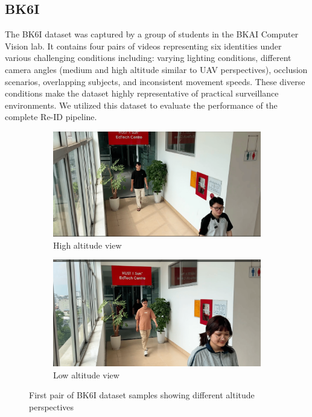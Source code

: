 \subsection{BK6I}

The BK6I dataset was captured by a group of students in the BKAI Computer Vision lab. It contains four pairs of videos representing six identities under various challenging conditions including: varying lighting conditions, different camera angles (medium and high altitude similar to UAV perspectives), occlusion scenarios, overlapping subjects, and inconsistent movement speeds. These diverse conditions make the dataset highly representative of practical surveillance environments. We utilized this dataset to evaluate the performance of the complete Re-ID pipeline.

\begin{figure}[htbp]
    \centering
    \begin{subfigure}[b]{0.48\textwidth}
        \centering
        \includegraphics[width=\textwidth]{Figure/edtech_high.png}
        \caption{High altitude view}
        \label{fig:edtech_high1}
    \end{subfigure}
    \hfill
    \begin{subfigure}[b]{0.48\textwidth}
        \centering
        \includegraphics[width=\textwidth]{Figure/edtech_low.png}
        \caption{Low altitude view}
        \label{fig:edtech_low1}
    \end{subfigure}
    \caption{First pair of BK6I dataset samples showing different altitude perspectives}
    \label{fig:bk6i_pair1}
\end{figure}

